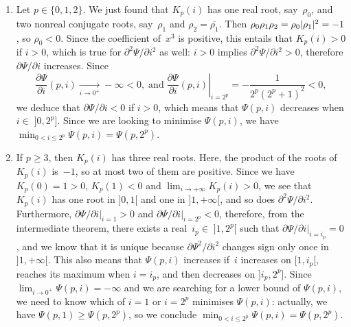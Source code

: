 \begin{enumerate}

  \item Let \(p \in \{0,1,2\}\). We just found that \(K_p(i)\) has one
    real root, say~\(\rho_0\), and two nonreal conjugate roots,
    say~\(\rho_1\) and \(\rho_2=\overline{\rho_1}\). Then
    \(\rho_0\rho_1\rho_2 = \rho_0 \lvert{\rho_1}\rvert{}^2 = -1\), so \(\rho_0 <
    0\). Since the coefficient of~\(x^3\) is positive, this entails
    that \(K_p(i) > 0\) if \(i > 0\), which is true for
    \(\partial^2\Psi/\partial i^2\) as well: \(i > 0 \) implies
    \(\partial^2\Psi/\partial i^2 > 0\), therefore
    \(\partial\Psi/\partial i\) increases. Since
  \begin{equation*}
    \frac{\partial\Psi}{\partial i}(p,i) \xrightarrow[i\to 0^{+}]{}
    -\infty < 0, \;\text{and}\; \left.\frac{\partial\Psi}{\partial
        i}(p,i)\right|_{i=2^p} = -\frac{1}{2^p(2^p+1)^2} < 0,
  \end{equation*}
  we deduce that \(\partial\Psi/\partial i < 0\) if \(i > 0\), which
  means that \(\Psi(p,i)\) decreases when \(i \in\; ]0,2^p]\). Since
  we are looking to minimise \(\Psi(p,i)\), we have \(\min_{0 < i
    \leqslant 2^p}\Psi(p,i) = \Psi(p,2^p)\).

\item If \(p \geqslant 3\), then \(K_p(i)\) has three real
  roots. Here, the product of the roots of \(K_p(i)\) is~\(-1\), so at
  most two of them are positive. Since we have \(K_p(0) = 1 > 0\),
  \(K_p(1) < 0\) and \(\lim_{i\to+\infty}K_p(i) > 0\), we see that
  \(K_p(i)\) has one root in \(]0,1[\) and one in \(]1,+\infty[\), and
  so does \(\partial^2\Psi/\partial i^2\). Furthermore,
  \(\left.\partial\Psi/\partial i\right|_{i=1} > 0\) and
  \(\left.\partial\Psi/\partial i\right|_{i=2^p} < 0\), therefore,
  from the intermediate theorem, there exists a real~\(i_p \in\;
  ]1,2^p[\) such that \(\left.\partial\Psi/\partial i\right|_{i=i_p} =
  0\), and we know that it is unique because \(\partial\Psi^2/\partial
  i^2\) changes sign only once in \(]1,+\infty[\). This also means
  that \(\Psi(p,i)\) increases if~\(i\) increases on \([1,i_p[\),
  reaches its maximum when \(i=i_p\), and then decreases on
  \(]i_p,2^p]\). Since \(\lim_{i \to 0^{+}}\Psi(p,i) = -\infty\) and
  we are searching for a lower bound of \(\Psi(p,i)\), we need to know
  which of \(i=1\) or \(i=2^p\) minimises \(\Psi(p,i)\): actually, we
  have \(\Psi(p,1) \geqslant \Psi(p,2^p)\), so we conclude \(\min_{0 <
    i \leqslant 2^p}\Psi(p,i) = \Psi(p,2^p)\).
\end{enumerate}
